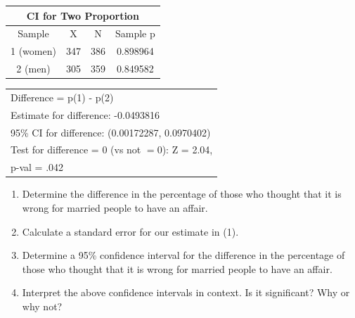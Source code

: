 \documentclass[11pt, chapterprefix=true]{scrbook}\usepackage[]{graphicx}\usepackage[]{color}
\begin{document}
\begin{exercises}
\begin{exercise}

    {\small{
    \begin{tabular}{@{} cccc @{}} \hline %
       \multicolumn{4}{c}{CI for Two Proportion} \\ \hline
       Sample & X & N & Sample p \\ \hline
       1 (women) & 347 & 386 & 0.898964 \\
       2 (men) & 305 & 359 & 0.849582 \\ \hline
    \end{tabular}
    }}

    {\footnotesize{
    \begin{tabular}{@{} l @{}}
    Difference = p(1) - p(2) \\
    Estimate for difference: -0.0493816 \\
    95\% CI for difference: (0.00172287, 0.0970402)  \\
    Test for difference = 0 (vs not $= 0$): Z = 2.04,  \\ p-val = .042
    \end{tabular}
    }}

\begin{enumerate}
\item Determine the difference in the percentage of those who thought that it is \\ wrong for married people to have an affair.

\item Calculate a standard error for our estimate in (1).

\item Determine a 95\% confidence interval for the difference in the percentage of those who thought that it is wrong for married people to have an affair.

\item Interpret the above confidence intervals in context.  Is it significant? Why or why not?


\end{enumerate}


\end{exercise}
\end{exercises}
\end{document}
